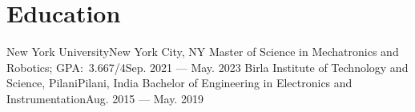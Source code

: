 \section{Education}
  \resumeSubHeadingListStart
    \resumeSubheading
      {New York University}{New York City, NY}
      {Master of Science in Mechatronics and Robotics;  GPA:\ 3.667/4}{Sep. 2021 --- May. 2023}
    \resumeSubheading
      {Birla Institute of Technology and Science, Pilani}{Pilani, India}
      {Bachelor of Engineering in Electronics and Instrumentation}{Aug. 2015 --- May. 2019}
  \resumeSubHeadingListEnd